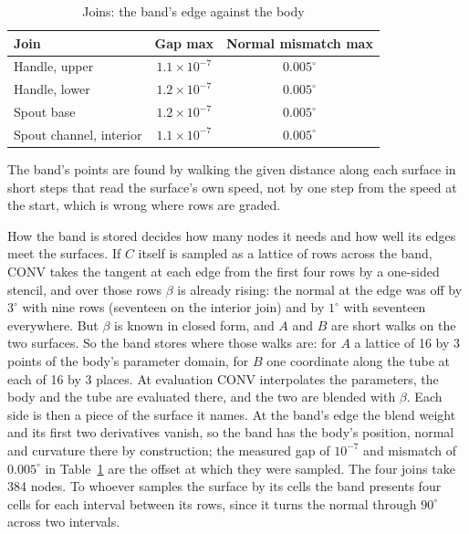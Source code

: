 \documentclass[journal]{IEEEtran}
\begin{document}
\begin{table}[H]
\caption{Joins: the band's edge against the body}
\label{tab:joinedges}
\centering
\scriptsize
\begin{tabular}{l|cc}
\hline
Join & Gap max & Normal mismatch max\\
\hline
Handle, upper & $1.1\times10^{-7}$ & $0.005^\circ$\\
Handle, lower & $1.2\times10^{-7}$ & $0.005^\circ$\\
Spout base & $1.2\times10^{-7}$ & $0.005^\circ$\\
Spout channel, interior & $1.1\times10^{-7}$ & $0.005^\circ$\\
\hline
\end{tabular}
\end{table}

The band's points are found by walking the given distance along each
surface in short steps that read the surface's own speed, not by one
step from the speed at the start, which is wrong where rows are graded.

How the band is stored decides how many nodes it needs and how well its
edges meet the surfaces. If $C$ itself is sampled as a lattice of rows
across the band, CONV takes the tangent at each edge from the first four
rows by a one-sided stencil, and over those rows $\beta$ is already
rising: the normal at the edge was off by $3^\circ$ with nine rows
(seventeen on the interior join) and by $1^\circ$ with seventeen
everywhere. But $\beta$ is known in closed form, and $A$ and $B$ are
short walks on the two surfaces. So the band stores where those walks
are: for $A$ a lattice of 16 by 3 points of the body's parameter domain,
for $B$ one coordinate along the tube at each of 16 by 3 places. At
evaluation CONV interpolates the parameters, the body and the tube are
evaluated there, and the two are blended with $\beta$. Each side is
then a piece of the surface it names. At the band's edge the blend
weight and its first two derivatives vanish, so the band has the body's
position, normal and curvature there by construction; the measured gap
of $10^{-7}$ and mismatch of $0.005^\circ$ in Table~\ref{tab:joinedges}
are the offset at which they were sampled. The four joins take 384 nodes. To whoever
samples the surface by its cells the band presents four cells for each
interval between its rows, since it turns the normal through $90^\circ$
across two intervals.
\end{document}
